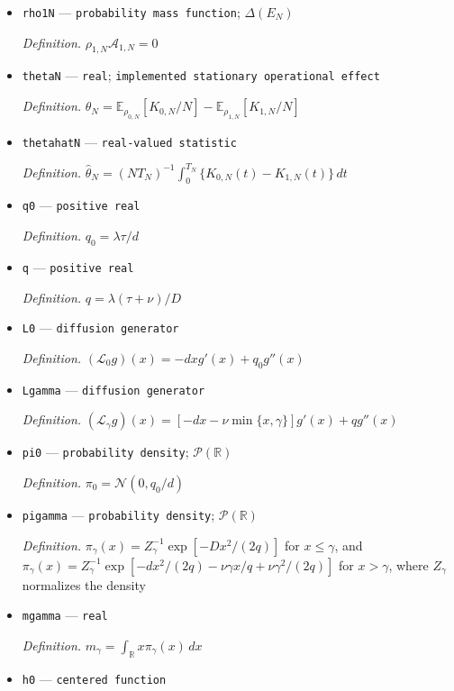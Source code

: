 \documentclass{article}
\begin{document}
\begin{itemize}
  \item \texttt{rho1N} --- \texttt{probability mass function}; \(\Delta(E_N)\)
  \par\smallskip\noindent\emph{Definition.} \(\rho_{1,N}\mathcal A_{1,N}=0\)
  \item \texttt{thetaN} --- \texttt{real}; \texttt{implemented stationary operational effect}
  \par\smallskip\noindent\emph{Definition.} \(\theta_N=\mathbb E_{\rho_{0,N}}[K_{0,N}/N]-\mathbb E_{\rho_{1,N}}[K_{1,N}/N]\)
  \item \texttt{thetahatN} --- \texttt{real-\allowbreak{}valued statistic}
  \par\smallskip\noindent\emph{Definition.} \(\widehat\theta_N=(NT_N)^{-1}\int_0^{T_N}\{K_{0,N}(t)-K_{1,N}(t)\}\,dt\)
  \item \texttt{q0} --- \texttt{positive real}
  \par\smallskip\noindent\emph{Definition.} \(q_0=\lambda\tau/d\)
  \item \texttt{q} --- \texttt{positive real}
  \par\smallskip\noindent\emph{Definition.} \(q=\lambda(\tau+\nu)/D\)
  \item \texttt{L0} --- \texttt{diffusion generator}
  \par\smallskip\noindent\emph{Definition.} \((\mathcal L_0g)(x)=-dxg'(x)+q_0g''(x)\)
  \item \texttt{Lgamma} --- \texttt{diffusion generator}
  \par\smallskip\noindent\emph{Definition.} \((\mathcal L_\gamma g)(x)=[-dx-\nu\min\{x,\gamma\}]g'(x)+qg''(x)\)
  \item \texttt{pi0} --- \texttt{probability density}; \(\mathcal P(\mathbb R)\)
  \par\smallskip\noindent\emph{Definition.} \(\pi_0=\mathcal N(0,q_0/d)\)
  \item \texttt{pigamma} --- \texttt{probability density}; \(\mathcal P(\mathbb R)\)
  \par\smallskip\noindent\emph{Definition.} \(\pi_\gamma(x)=Z_\gamma^{-1}\exp[-Dx^2/(2q)]\) for \(x\le\gamma\), and \(\pi_\gamma(x)=Z_\gamma^{-1}\exp[-dx^2/(2q)-\nu\gamma x/q+\nu\gamma^2/(2q)]\) for \(x>\gamma\), where \(Z_\gamma\) normalizes the density
  \item \texttt{mgamma} --- \texttt{real}
  \par\smallskip\noindent\emph{Definition.} \(m_\gamma=\int_{\mathbb R}x\pi_\gamma(x)\,dx\)
  \item \texttt{h0} --- \texttt{centered function}

\end{itemize}
\end{document}
